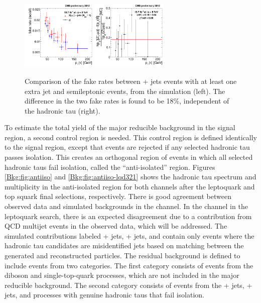 \begin{figure}[hbt]
  \begin{center}
    \includegraphics[width=0.32\textwidth]{figures/bkgEstim/ttbar_fr_comp_final.pdf}
    \includegraphics[width=0.32\textwidth]{figures/bkgEstim/tfr_diff_ttbar_incl.pdf}
    \caption{Comparison of the fake rates between \Zmm + jets events with at least one extra jet and semileptonic \ttbar events, from the simulation (left). The difference in the two fake rates is found to be 18\%, independent of the hadronic tau \pt (right). \label{fig:fakeratettbardiff}}
  \end{center}
\end{figure}

To estimate the total yield of the major reducible background in the signal region, a second control region is needed. This control region is defined identically to the signal region, except that events are rejected if any selected hadronic tau passes isolation. This creates an orthogonal region of events in which all selected hadronic taus fail isolation, called the ``anti-isolated'' region. Figures \ref{Bkg:fig:antiiso} and \ref{Bkg:fig:antiiso-lqd321} shows the hadronic tau \pt spectrum and multiplicity in the anti-isolated region for both channels after the leptoquark and top squark final selections, respectively. There is good agreement between observed data and simulated backgrounds in the \mutau channel. In the \etau channel in the leptoquark search, there is an expected disagreement due to a contribution from QCD multijet events in the observed data, which will be addressed. The simulated contributions labeled \W + jets, \Z + jets, and \ttbar contain only events where the hadronic tau candidates are misidentified jets based on matching between the generated and reconstructed particles. The residual background is defined to include events from two categories. The first category consists of events from the diboson and single-top-quark processes, which are not included in the major reducible background. The second category consists of events from the \W + jets, \Z + jets, and \ttbar processes with genuine hadronic taus that fail isolation.

